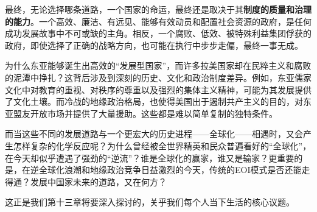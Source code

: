 最终，无论选择哪条道路，一个国家的命运，最终还是取决于其\textbf{制度的质量和治理的能力}。一个高效、廉洁、有远见、能够有效动员和配置社会资源的政府，是任何成功发展故事中不可或缺的主角。相反，一个腐败、低效、被特殊利益集团俘获的政府，即使选择了正确的战略方向，也可能在执行中步步走偏，最终一事无成。

为什么东亚能够诞生出高效的“发展型国家”，而许多拉美国家却在民粹主义和腐败的泥潭中挣扎？这背后涉及到深刻的历史、文化和政治制度差异。例如，东亚儒家文化中对教育的重视、对秩序的尊重以及强烈的集体主义精神，可能为其发展提供了文化土壤。而冷战的地缘政治格局，也使得美国出于遏制共产主义的目的，对东亚盟友开放市场并提供了大量援助。这些都是难以简单复制的独特条件。

而当这些不同的发展道路与一个更宏大的历史进程——全球化——相遇时，又会产生怎样复杂的化学反应呢？为什么曾经被全世界精英和民众普遍看好的“全球化”，在今天却似乎遭遇了强劲的“逆流”？谁是全球化的赢家，谁又是输家？更重要的是，在逆全球化浪潮和地缘政治竞争日益激烈的今天，传统的EOI模式是否还能走得通？发展中国家未来的道路，又在何方？

这正是我们第十三章将要深入探讨的，关乎我们每个人当下生活的核心议题。